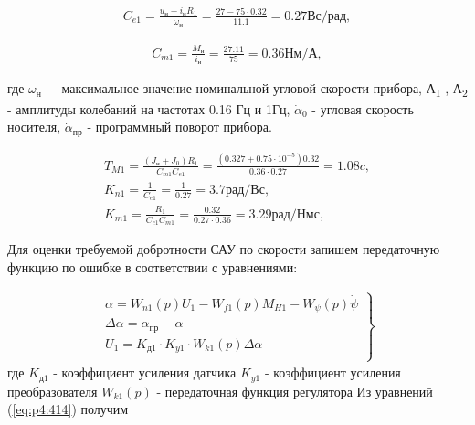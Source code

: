 \begin{equation}
\label{eq:p4:sec4/2}
\begin{multlined}
C_{e1}=
\frac{u_\textit{н}-i_{\textit{н}}R_{1}}{ \omega _{\textit{н}}}=
\frac{27-75 \cdot 0.32}{11.1}=
0.27 \textit{Вс/рад},
\end{multlined}
\end{equation}

\begin{equation}
\label{eq:p4:sec4/3}
\begin{multlined}
C_{m1}=
\frac{M_{\textit{н}}}{i_{\textit{н}}}=
\frac{27.11}{75}=0.36 \textit{Нм/А},
\end{multlined}
\end{equation}

где  \(  \omega _{\textit{н}}- \) максимальное значение номинальной угловой скорости прибора, А\textsubscript{1} , А\textsubscript{2 }- амплитуды колебаний на частотах 0.16 Гц и 1Гц,  \( \dot \alpha _{0} \)  - угловая скорость носителя,  \( \dot \alpha _{\textit{пр}} \) - программный поворот прибора.\par

\begin{equation}
\label{eq:p4:sec4/4}
\begin{alignedat}{2}
T_{M1}=
\frac{ \left( J_{\textit{н}}+J_{0} \right) R_{1}}{C_{m1}C_{e1}}=\frac{ \left( 0.327 + 0.75 \cdot 10^{-5} \right) 0.32}{0.36 \cdot 0.27}=
1.08 \textit{c} ,\\
K_{n1} = \frac{1}{C_{e1}} = \frac{1}{0.27} = 3.7 \textit{рад/Вс},\\
K_{m1} = \frac{R_1}{C_{e1} C_{m1}} = \frac{0.32}{0.27 \cdot 0.36} = 3.29 \textit{рад/Нмс},
\end{alignedat}
\end{equation}

Для оценки требуемой добротности САУ по скорости запишем передаточную функцию по ошибке в соответствии с уравнениями:\par


\begin{equation}%
\label{eq:p4:414}
\begin{alignedat}{2}
\left. \begin{array}{ll}
\alpha =W_{n1} \left( p \right) U_{1}-W_{f1} \left( p \right) M_{H1}-W_{ \psi } \left( p \right) \dot \psi\\
\Delta  \alpha = \alpha _{\textit{пр}}- \alpha\\
U_{1}=K_{\textit{д1}}\cdot K_{y1} \cdot W_{k1} \left( p \right)  \Delta  \alpha \\
\end{array}  \right\rbrace  
\end{alignedat}
\end{equation}
где
$K_{\textit{д1}}$ - коэффициент усиления датчика
$K_{\textit{y1}}$ - коэффициент усиления преобразователя
$W_{k1} \left( p \right)$ - передаточная функция регулятора
Из уравнений (\ref{eq:p4:414}) получим

